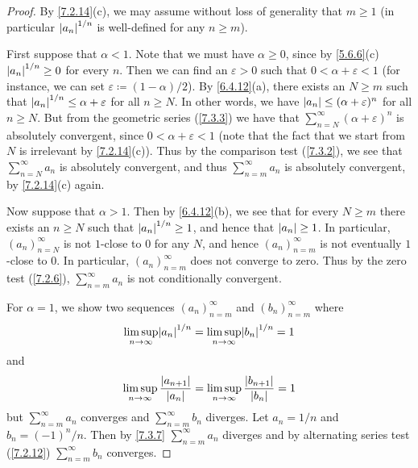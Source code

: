 \begin{proof}
  By \cref{7.2.14}(c), we may assume without loss of generality that \(m \geq 1\)
  (in particular \(\left\lvert a_n\right\rvert^{1 / n}\) is well-defined for any \(n \geq m\)).

  First suppose that \(\alpha < 1\).
  Note that we must have \(\alpha \geq 0\), since by \cref{5.6.6}(c) \(\left\lvert a_n\right\rvert^{1 / n} \geq 0\) for every \(n\).
  Then we can find an \(\varepsilon > 0\) such that \(0 < \alpha + \varepsilon < 1\) (for instance, we can set \(\varepsilon \coloneqq (1 - \alpha) / 2\)).
  By \cref{6.4.12}(a), there exists an \(N \geq m\) such that \(\left\lvert a_n\right\rvert^{1 / n} \leq \alpha + \varepsilon\) for all \(n \geq N\).
  In other words, we have \(\left\lvert a_n\right\rvert \leq (\alpha + \varepsilon)^n\) for all \(n \geq N\).
  But from the geometric series (\cref{7.3.3}) we have that \(\sum_{n = N}^\infty (\alpha + \varepsilon)^n\) is absolutely convergent, since \(0 < \alpha + \varepsilon < 1\)
  (note that the fact that we start from \(N\) is irrelevant by \cref{7.2.14}(c)).
  Thus by the comparison test (\cref{7.3.2}), we see that \(\sum_{n = N}^\infty a_n\) is absolutely convergent, and thus \(\sum_{n = m}^\infty a_n\) is absolutely convergent, by \cref{7.2.14}(c) again.

  Now suppose that \(\alpha > 1\).
  Then by \cref{6.4.12}(b), we see that for every \(N \geq m\) there exists an \(n \geq N\) such that \(\left\lvert a_n\right\rvert^{1 / n} \geq 1\), and hence that \(\left\lvert a_n\right\rvert \geq 1\).
  In particular, \((a_n)_{n = N}^\infty\) is not \(1\)-close to \(0\) for any \(N\), and hence \((a_n)_{n = m}^\infty\) is not eventually \(1\)-close to \(0\).
  In particular, \((a_n)_{n = m}^\infty\) does not converge to zero.
  Thus by the zero test (\cref{7.2.6}), \(\sum_{n = m}^\infty a_n\) is not conditionally convergent.

  For \(\alpha = 1\), we show two sequences \((a_n)_{n = m}^\infty\) and \((b_n)_{n = m}^\infty\) where
  \[
    \limsup_{n \to \infty} \abs{a_n}^{1 / n} = \limsup_{n \to \infty} \abs{b_n}^{1 / n} = 1
  \]
  and
  \[
    \limsup_{n \to \infty} \dfrac{\left\lvert a_{n + 1}\right\rvert}{\left\lvert a_n\right\rvert} = \limsup_{n \to \infty} \dfrac{\left\lvert b_{n + 1}\right\rvert}{\left\lvert b_n\right\rvert} = 1
  \]
  but \(\sum_{n = m}^\infty a_n\) converges and \(\sum_{n = m}^\infty b_n\) diverges.
  Let \(a_n = 1 / n\) and \(b_n = (-1)^n / n\).
  Then by \cref{7.3.7} \(\sum_{n = m}^\infty a_n\) diverges and by alternating series test (\cref{7.2.12}) \(\sum_{n = m}^\infty b_n\) converges.


\end{proof}

